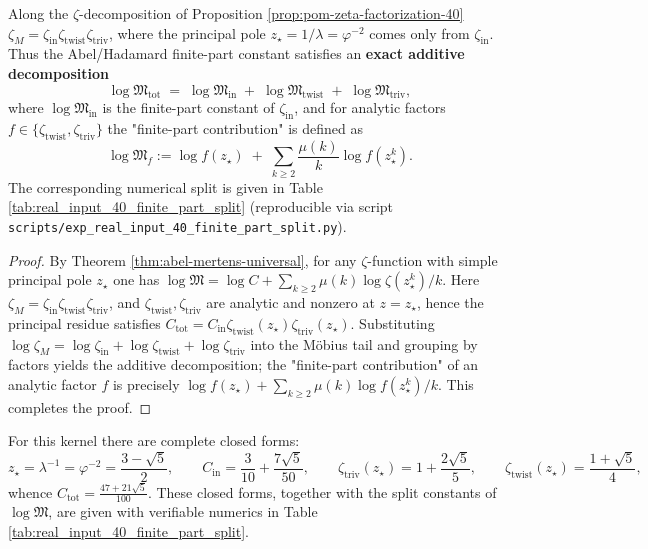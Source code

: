 \begin{corollary}\label{cor:pom-logM-split-40}
Along the \(\zeta\)-decomposition of Proposition \ref{prop:pom-zeta-factorization-40}
\(
\zeta_M=\zeta_{\mathrm{in}}\zeta_{\mathrm{twist}}\zeta_{\mathrm{triv}}
\), where the principal pole \(z_\star=1/\lambda=\varphi^{-2}\) comes only from \(\zeta_{\mathrm{in}}\).
Thus the Abel/Hadamard finite-part constant satisfies an \textbf{exact additive decomposition}
\[
\log\mathfrak{M}_{\mathrm{tot}}
\;=\;
\log\mathfrak{M}_{\mathrm{in}}
\;+\;
\log\mathfrak{M}_{\mathrm{twist}}
\;+\;
\log\mathfrak{M}_{\mathrm{triv}},
\]
where \(\log\mathfrak{M}_{\mathrm{in}}\) is the finite-part constant of \(\zeta_{\mathrm{in}}\), and for analytic factors \(f\in\{\zeta_{\mathrm{twist}},\zeta_{\mathrm{triv}}\}\) the "finite-part contribution" is defined as
\[
\log\mathfrak{M}_f
:=
\log f(z_\star)
\;+\;
\sum_{k\ge 2}\frac{\mu(k)}{k}\log f(z_\star^k).
\]
The corresponding numerical split is given in Table \ref{tab:real_input_40_finite_part_split} (reproducible via script \texttt{scripts/exp\_real\_input\_40\_finite\_part\_split.py}).
\end{corollary}

\begin{proof}
By Theorem \ref{thm:abel-mertens-universal}, for any \(\zeta\)-function with simple principal pole \(z_\star\) one has
\(
\log\mathfrak{M}=\log C+\sum_{k\ge 2}\mu(k)\log\zeta(z_\star^k)/k
\).
Here \(\zeta_M=\zeta_{\mathrm{in}}\zeta_{\mathrm{twist}}\zeta_{\mathrm{triv}}\), and \(\zeta_{\mathrm{twist}},\zeta_{\mathrm{triv}}\) are analytic and nonzero at \(z=z_\star\), hence the principal residue satisfies
\(
C_{\mathrm{tot}}=C_{\mathrm{in}}\zeta_{\mathrm{twist}}(z_\star)\zeta_{\mathrm{triv}}(z_\star)
\).
Substituting \(\log\zeta_M=\log\zeta_{\mathrm{in}}+\log\zeta_{\mathrm{twist}}+\log\zeta_{\mathrm{triv}}\) into the Möbius tail and grouping by factors yields the additive decomposition; the "finite-part contribution" of an analytic factor \(f\) is precisely
\(
\log f(z_\star)+\sum_{k\ge2}\mu(k)\log f(z_\star^k)/k
\).
This completes the proof.
\end{proof}

\begin{remark}\label{rem:pom-logM-split-40-exact}
For this kernel there are complete closed forms:
\[
z_\star=\lambda^{-1}=\varphi^{-2}=\frac{3-\sqrt5}{2},
\qquad
C_{\mathrm{in}}=\frac{3}{10}+\frac{7\sqrt5}{50},
\qquad
\zeta_{\mathrm{triv}}(z_\star)=1+\frac{2\sqrt5}{5},
\qquad
\zeta_{\mathrm{twist}}(z_\star)=\frac{1+\sqrt5}{4},
\]
whence
\(
C_{\mathrm{tot}}=\frac{47+21\sqrt5}{100}
\).
These closed forms, together with the split constants of \(\log\mathfrak{M}\), are given with verifiable numerics in Table \ref{tab:real_input_40_finite_part_split}.
\end{remark}

